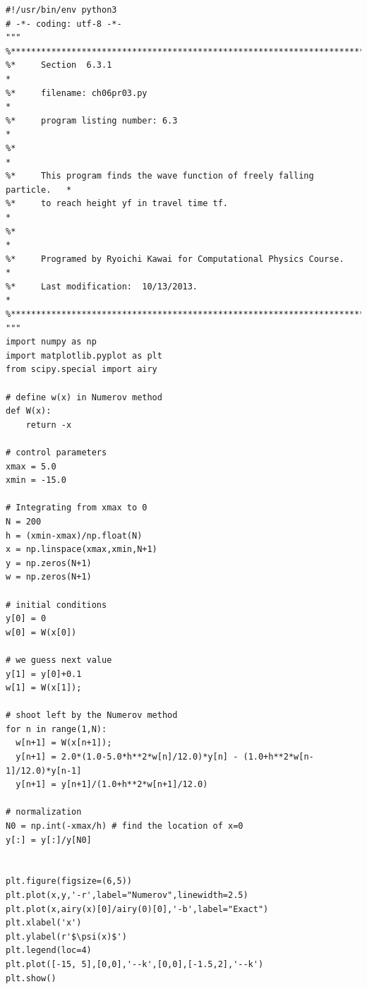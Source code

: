 \begin{verbatim}
#!/usr/bin/env python3
# -*- coding: utf-8 -*-
"""
%**************************************************************************
%*     Section  6.3.1                                                     *
%*     filename: ch06pr03.py                                              *
%*     program listing number: 6.3                                        *
%*                                                                        *
%*     This program finds the wave function of freely falling particle.   *
%*     to reach height yf in travel time tf.                              *
%*                                                                        *
%*     Programed by Ryoichi Kawai for Computational Physics Course.       *
%*     Last modification:  10/13/2013.                                    *
%**************************************************************************
"""
import numpy as np
import matplotlib.pyplot as plt
from scipy.special import airy 

# define w(x) in Numerov method
def W(x):
    return -x

# control parameters
xmax = 5.0
xmin = -15.0

# Integrating from xmax to 0
N = 200
h = (xmin-xmax)/np.float(N)
x = np.linspace(xmax,xmin,N+1)
y = np.zeros(N+1)
w = np.zeros(N+1)

# initial conditions
y[0] = 0
w[0] = W(x[0])

# we guess next value
y[1] = y[0]+0.1
w[1] = W(x[1]);

# shoot left by the Numerov method
for n in range(1,N):
  w[n+1] = W(x[n+1]);
  y[n+1] = 2.0*(1.0-5.0*h**2*w[n]/12.0)*y[n] - (1.0+h**2*w[n-1]/12.0)*y[n-1]
  y[n+1] = y[n+1]/(1.0+h**2*w[n+1]/12.0)

# normalization
N0 = np.int(-xmax/h) # find the location of x=0
y[:] = y[:]/y[N0]


plt.figure(figsize=(6,5))
plt.plot(x,y,'-r',label="Numerov",linewidth=2.5)
plt.plot(x,airy(x)[0]/airy(0)[0],'-b',label="Exact")
plt.xlabel('x')
plt.ylabel(r'$\psi(x)$')
plt.legend(loc=4)
plt.plot([-15, 5],[0,0],'--k',[0,0],[-1.5,2],'--k')
plt.show()
\end{verbatim}
\normalsize
\bigskip
\noindent
\program
\footnotesize
